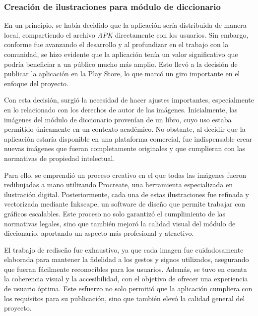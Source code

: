 
\subsubsection{Creación de ilustraciones para módulo de diccionario}

En un principio, se había decidido que la aplicación sería distribuida de manera local, compartiendo el archivo \textit{APK} directamente con los usuarios. Sin embargo, conforme fue avanzando el desarrollo y al profundizar en el trabajo con la comunidad, se hizo evidente que la aplicación tenía un valor significativo que podría beneficiar a un público mucho más amplio. Esto llevó a la decisión de publicar la aplicación en la Play Store, lo que marcó un giro importante en el enfoque del proyecto.

Con esta decisión, surgió la necesidad de hacer ajustes importantes, especialmente en lo relacionado con los derechos de autor de las imágenes. Inicialmente, las imágenes del módulo de diccionario provenían de un libro, cuyo uso estaba permitido únicamente en un contexto académico. No obstante, al decidir que la aplicación estaría disponible en una plataforma comercial, fue indispensable crear nuevas imágenes que fueran completamente originales y que cumplieran con las normativas de propiedad intelectual.

Para ello, se emprendió un proceso creativo en el que todas las imágenes fueron redibujadas a mano utilizando Procreate, una herramienta especializada en ilustración digital. Posteriormente, cada una de estas ilustraciones fue refinada y vectorizada mediante Inkscape, un software de diseño que permite trabajar con gráficos escalables. Este proceso no solo garantizó el cumplimiento de las normativas legales, sino que también mejoró la calidad visual del módulo de diccionario, aportando un aspecto más profesional y atractivo.

El trabajo de rediseño fue exhaustivo, ya que cada imagen fue cuidadosamente elaborada para mantener la fidelidad a los gestos y signos utilizados, asegurando que fueran fácilmente reconocibles para los usuarios. Además, se tuvo en cuenta la coherencia visual y la accesibilidad, con el objetivo de ofrecer una experiencia de usuario óptima. Este esfuerzo no solo permitió que la aplicación cumpliera con los requisitos para su publicación, sino que también elevó la calidad general del proyecto.


